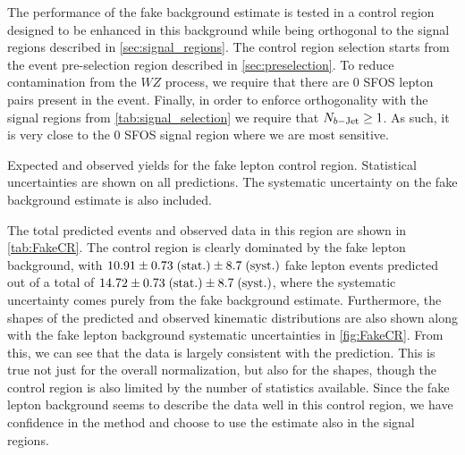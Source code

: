 



The performance of the fake background estimate is tested in a control region
designed to be enhanced in this background while being orthogonal to the signal regions
described in \sec\ref{sec:signal_regions}.
The control region selection starts from the event pre-selection region described 
in \sec\ref{sec:preselection}. To reduce contamination 
from the $WZ$ process, we require that there are 0 SFOS 
lepton pairs present in the event.
Finally, in order to enforce 
orthogonality with the signal regions
from \tab\ref{tab:signal_selection}
we require that $N_{b-\textrm{Jet}} \geq 1$. 
As such, it is very close to the 0 SFOS signal region where we are most sensitive.

\begin{table}[tb]
\centering

\caption{Expected and observed yields for the fake lepton control region. 
Statistical uncertainties are shown on all predictions. The systematic
uncertainty on the fake background estimate is also included.}
\label{tab:FakeCR}
\end{table}




The total predicted events and observed data in this region are shown in \tab\ref{tab:FakeCR}.
The control region is clearly dominated by the fake lepton background, with $10.91 \pm 0.73\mbox{$\;$(stat.)} \pm 8.7 \mbox{$\;$(syst.)}$ 
fake lepton events predicted out of a total of $14.72 \pm 0.73\mbox{$\;$(stat.)} \pm 8.7 \mbox{$\;$(syst.)}$,
where the systematic uncertainty comes purely from the fake background
estimate. Furthermore, the shapes
of the predicted and observed kinematic distributions are also shown along with the
fake lepton background systematic uncertainties in \fig\ref{fig:FakeCR}.  From this, 
we can see that the data is largely consistent with the prediction. This is true not just
for the overall normalization, but also for the shapes, though the control region is also 
limited by the number of statistics available. Since the fake lepton background
seems to describe the data well in this control region, we have confidence in the method
and choose to use the estimate also in the signal regions. 



